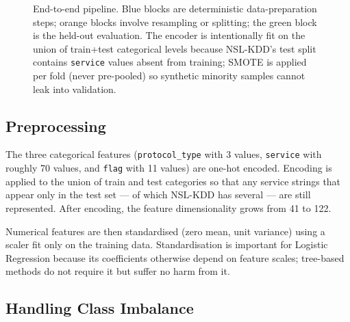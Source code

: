 \documentclass[conference, twocolumn]{IEEEtran}
\begin{document}
\begin{figure}[!t]
\caption{End-to-end pipeline. Blue blocks are deterministic data-preparation steps; orange blocks involve resampling or splitting; the green block is the held-out evaluation. The encoder is intentionally fit on the union of train+test categorical levels because NSL-KDD's test split contains \texttt{service} values absent from training; SMOTE is applied per fold (never pre-pooled) so synthetic minority samples cannot leak into validation.}
\label{fig:pipeline}
\end{figure}

\subsection{Preprocessing}

The three categorical features (\texttt{protocol\_type} with 3 values, \texttt{service} with roughly 70 values, and \texttt{flag} with 11 values) are one-hot encoded. Encoding is applied to the union of train and test categories so that any service strings that appear only in the test set --- of which NSL-KDD has several --- are still represented. After encoding, the feature dimensionality grows from 41 to 122.

Numerical features are then standardised (zero mean, unit variance) using a scaler fit only on the training data. Standardisation is important for Logistic Regression because its coefficients otherwise depend on feature scales; tree-based methods do not require it but suffer no harm from it.

\subsection{Handling Class Imbalance}
\end{document}
